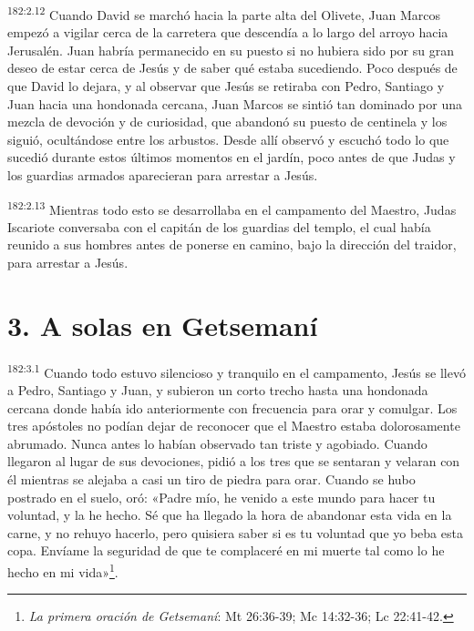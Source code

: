 \par
\textsuperscript{182:2.12} Cuando David se marchó hacia la parte alta del Olivete, Juan Marcos empezó a vigilar cerca de la carretera que descendía a lo largo del arroyo hacia Jerusalén. Juan habría permanecido en su puesto si no hubiera sido por su gran deseo de estar cerca de Jesús y de saber qué estaba sucediendo. Poco después de que David lo dejara, y al observar que Jesús se retiraba con Pedro, Santiago y Juan hacia una hondonada cercana, Juan Marcos se sintió tan dominado por una mezcla de devoción y de curiosidad, que abandonó su puesto de centinela y los siguió, ocultándose entre los arbustos. Desde allí observó y escuchó todo lo que sucedió durante estos últimos momentos en el jardín, poco antes de que Judas y los guardias armados aparecieran para arrestar a Jesús.

\par
\textsuperscript{182:2.13} Mientras todo esto se desarrollaba en el campamento del Maestro, Judas Iscariote conversaba con el capitán de los guardias del templo, el cual había reunido a sus hombres antes de ponerse en camino, bajo la dirección del traidor, para arrestar a Jesús.

\section*{3. A solas en Getsemaní}
\par
\textsuperscript{182:3.1} Cuando todo estuvo silencioso y tranquilo en el campamento, Jesús se llevó a Pedro, Santiago y Juan, y subieron un corto trecho hasta una hondonada cercana donde había ido anteriormente con frecuencia para orar y comulgar. Los tres apóstoles no podían dejar de reconocer que el Maestro estaba dolorosamente abrumado. Nunca antes lo habían observado tan triste y agobiado. Cuando llegaron al lugar de sus devociones, pidió a los tres que se sentaran y velaran con él mientras se alejaba a casi un tiro de piedra para orar. Cuando se hubo postrado en el suelo, oró: «Padre mío, he venido a este mundo para hacer tu voluntad, y la he hecho. Sé que ha llegado la hora de abandonar esta vida en la carne, y no rehuyo hacerlo, pero quisiera saber si es tu voluntad que yo beba esta copa. Envíame la seguridad de que te complaceré en mi muerte tal como lo he hecho en mi vida»\footnote{\textit{La primera oración de Getsemaní}: Mt 26:36-39; Mc 14:32-36; Lc 22:41-42.}.

